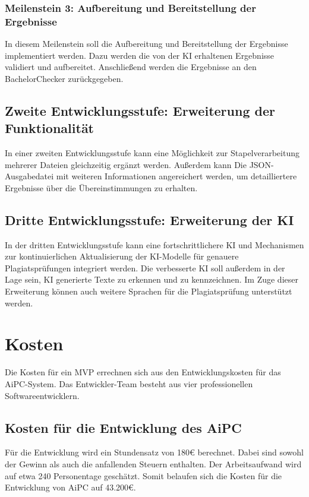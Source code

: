 \subsubsection{Meilenstein 3: Aufbereitung und Bereitstellung der Ergebnisse}
In diesem Meilenstein soll die Aufbereitung und Bereitstellung der Ergebnisse implementiert werden.
Dazu werden die von der \ac{KI} erhaltenen Ergebnisse validiert und aufbereitet.
Anschließend werden die Ergebnisse an den BachelorChecker zurückgegeben.

\subsection{Zweite Entwicklungsstufe: Erweiterung der Funktionalität}
In einer zweiten Entwicklungsstufe kann eine Möglichkeit zur Stapelverarbeitung mehrerer Dateien gleichzeitig ergänzt werden. 
Außerdem kann Die \ac{JSON}-Ausgabedatei mit weiteren Informationen angereichert werden, um detailliertere Ergebnisse über die Übereinstimmungen zu erhalten.

\subsection{Dritte Entwicklungsstufe: Erweiterung der KI}
In der dritten Entwicklungsstufe kann eine fortschrittlichere \ac{KI} und Mechanismen zur kontinuierlichen Aktualisierung der \ac{KI}-Modelle für genauere Plagiatsprüfungen integriert werden.
Die verbesserte \ac{KI} soll außerdem in der Lage sein, \ac{KI} generierte Texte zu erkennen und zu kennzeichnen.
Im Zuge dieser Erweiterung können auch weitere Sprachen für die Plagiatsprüfung unterstützt werden.

\section{Kosten}\label{sec:kosten}

Die Kosten für ein \ac{MVP} errechnen sich aus den Entwicklungskosten für das \ac{AiPC}-System.
Das Entwickler-Team besteht aus vier professionellen Softwareentwicklern.

\subsection{Kosten für die Entwicklung des AiPC}\label{subsec:kosten-für-die-entwicklung-des-aipc}

Für die Entwicklung wird ein Stundensatz von 180€ berechnet. %
Dabei sind sowohl der Gewinn als auch die anfallenden Steuern enthalten.
Der Arbeitsaufwand wird auf etwa 240 Personentage geschätzt.
Somit belaufen sich die Kosten für die Entwicklung von \ac{AiPC} auf 43.200€.

